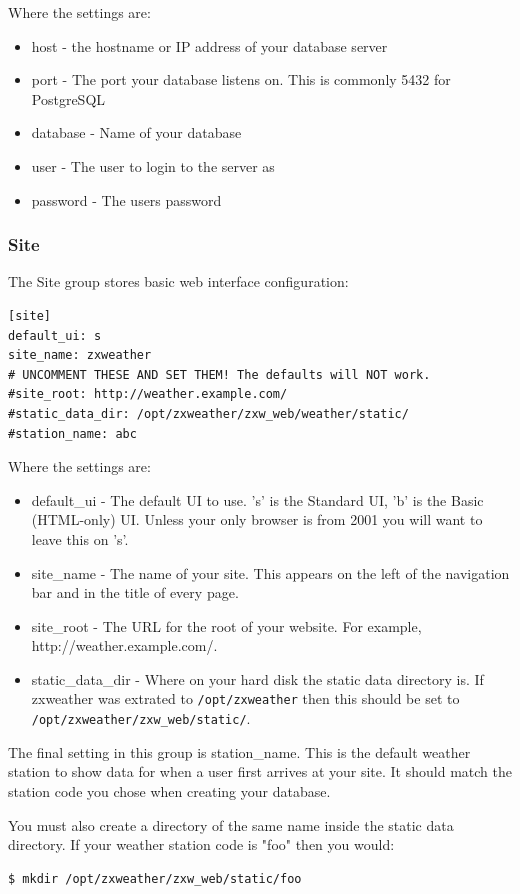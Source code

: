 \documentclass[a4paper,10pt,draft]{book}
\begin{document}
Where the settings are:
\begin{itemize}
\item host - the hostname or IP address of your database server
\item port - The port your database listens on. This is commonly 5432 for PostgreSQL
\item database - Name of your database
\item user - The user to login to the server as
\item password - The users password
\end{itemize}


\subsubsection{Site}
The Site group stores basic web interface configuration:
\begin{verbatim}
[site]
default_ui: s
site_name: zxweather
# UNCOMMENT THESE AND SET THEM! The defaults will NOT work.
#site_root: http://weather.example.com/
#static_data_dir: /opt/zxweather/zxw_web/weather/static/
#station_name: abc
\end{verbatim}

Where the settings are:
\begin{itemize}
\item default\_ui - The default UI to use. 's' is the Standard UI, 'b' is the Basic (HTML-only) UI. Unless your only browser is from 2001 you will want to leave this on 's'.
\item site\_name - The name of your site. This appears on the left of the navigation bar and in the title of every page.
\item site\_root - The URL for the root of your website. For example, http://weather.example.com/.
\item static\_data\_dir - Where on your hard disk the static data directory is. If zxweather was extrated to \verb|/opt/zxweather| then this should be set to \verb|/opt/zxweather/zxw_web/static/|.
\end{itemize}

The final setting in this group is station\_name. This is the default weather station to show data for when a user first arrives at your site. It should match the station code you chose when creating your database.

You must also create a directory of the same name inside the static data directory. If your weather station code is "foo" then you would:
\begin{verbatim}
$ mkdir /opt/zxweather/zxw_web/static/foo
\end{verbatim}
\end{document}
